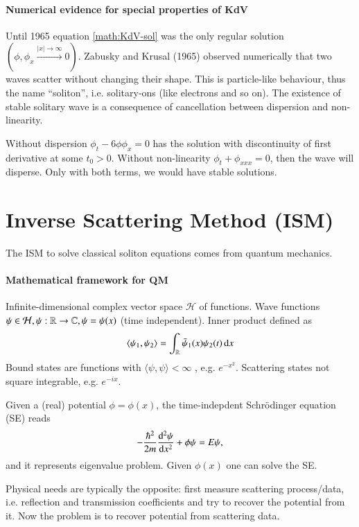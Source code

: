 \paragraph{Numerical evidence for special properties of KdV}
Until 1965 equation \eqref{math:KdV-sol} was the only regular solution $(\phi, \phi_x \stackrel{|x| \rightarrow \infty}{\rightarrow} 0)$. Zabusky and Krusal (1965) observed numerically that two waves scatter without changing their shape. This is particle-like behaviour, thus the name ``soliton'', i.e. solitary-ons (like electrons and so on). The existence of stable solitary wave is a consequence of cancellation between dispersion and non-linearity.

Without dispersion $\phi_t - 6 \phi \phi_x = 0$ has the solution with discontinuity of first derivative at some $t_0 > 0$. Without non-linearity $\phi_t + \phi_{x x x} = 0$, then the wave will disperse. Only with both terms, we would have stable solutions.

\section{Inverse Scattering Method (ISM)}
The ISM to solve classical soliton equations comes from quantum mechanics.

\paragraph{Mathematical framework for QM}
Infinite-dimensional complex vector space $\mathcal{H}$ of functions. Wave functions $\psi \in \mathcal{H}, \psi: \mathbb{R} \rightarrow \mathbb{C}, \psi = \psi(x)$ (time independent). Inner product defined as 
\begin{equation}
	\langle \psi_1, \psi_2 \rangle = \int_{\mathbb{R}} \bar{\psi}_1 (x) \psi_2(t) \dd{x}
	\label{math:2.1}
\end{equation}
Bound states are functions with $\langle \psi, \psi \rangle < \infty$ , e.g. $e^{-x^2}$.  Scattering states not square integrable, e.g. $e^{-ix}$.

Given a (real) potential $\phi = \phi(x)$, the time-indepdent Schrödinger equation (SE) reads 
\begin{equation*}
	- \frac{\hbar^2}{2m} \dv[2]{\psi}{x} + \phi \psi = E \psi,
\end{equation*}
and it represents eigenvalue problem. Given $\phi(x)$ one can solve the SE.

Physical needs are typically the opposite: first measure scattering process/data, i.e. reflection and transmission coefficients and try to recover the potential from it. Now the problem is to recover potential from scattering data.

